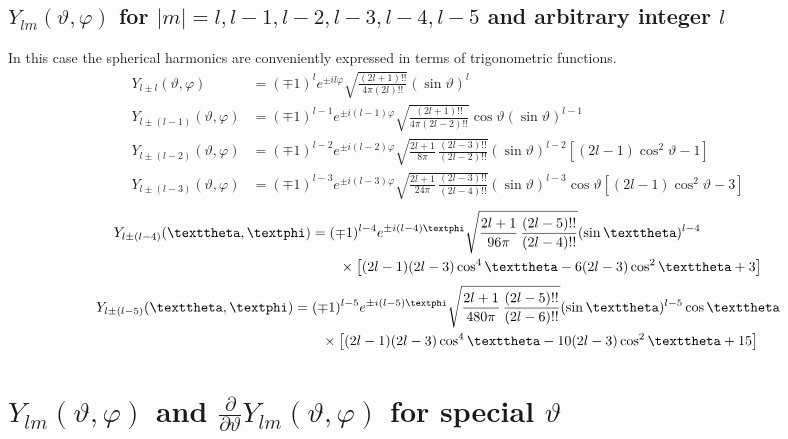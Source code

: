 \subsection{$Y_{l m}(\vartheta, \varphi)$ for $|m|=l, l-1, l-2, l-3, l-4, l-5$ and arbitrary integer $l$}\label{sec:5.13.3}
In this case the spherical harmonics are conveniently expressed in terms of trigonometric functions.
\begin{align}
Y_{l \pm l}(\vartheta, \varphi) & =(\mp 1)^{l} e^{ \pm i l \varphi} \sqrt{\frac{(2 l+1)!!}{4 \pi(2 l)!!}}(\sin \vartheta)^{l}  \label{eq:5:13:6}\\
Y_{l \pm(l-1)}(\vartheta, \varphi) & =(\mp 1)^{l-1} e^{ \pm i(l-1) \varphi} \sqrt{\frac{(2 l+1)!!}{4 \pi(2 l-2)!!}} \cos \vartheta(\sin \vartheta)^{l-1}  \label{eq:5:13:7}\\
Y_{l \pm(l-2)}(\vartheta, \varphi) & =(\mp 1)^{l-2} e^{ \pm i(l-2) \varphi} \sqrt{\frac{2 l+1}{8 \pi} \, \frac{(2 l-3)!!}{(2 l-2)!!}}(\sin \vartheta)^{l-2}\left[(2 l-1) \cos ^{2} \vartheta-1\right]  \label{eq:5:13:8}\\
Y_{l \pm(l-3)}(\vartheta, \varphi) & =(\mp 1)^{l-3} e^{ \pm i(l-3) \varphi} \sqrt{\frac{2 l+1}{24 \pi} \, \frac{(2 l-3)!!}{(2 l-4)!!}}(\sin \vartheta)^{l-3} \cos \vartheta\left[(2 l-1) \cos ^{2} \vartheta-3\right] \label{eq:5:13:9}
\end{align}
\begin{align}
 Y_{l \pm(l-4)}(\vartheta, \varphi)&=(\mp 1)^{l-4} e^{ \pm i(l-4) \varphi} \sqrt{\frac{2 l+1}{96 \pi} \, \frac{(2 l-5)!!}{(2 l-4)!!}}(\sin \vartheta)^{l-4}  \notag\\
& \qquad\times\left[(2 l-1)(2 l-3) \cos ^{4} \vartheta-6(2 l-3) \cos ^{2} \vartheta+3\right] \label{eq:5:13:10}
\end{align}
\begin{align}
 Y_{l \pm(l-5)}(\vartheta, \varphi)&=(\mp 1)^{l-5} e^{ \pm i(l-5) \varphi} \sqrt{\frac{2 l+1}{480 \pi} \, \frac{(2 l-5)!!}{(2 l-6)!!}}(\sin \vartheta)^{l-5} \cos \vartheta  \notag\\
&\qquad \times\left[(2 l-1)(2 l-3) \cos ^{4} \vartheta-10(2 l-3) \cos ^{2} \vartheta+15\right] \label{eq:5:13:11}
\end{align}
\section{$Y_{l m}(\vartheta, \varphi)$ and $\frac{\partial}{\partial \vartheta} Y_{l m}(\vartheta, \varphi)$ for special $\vartheta$}\label{sec:5.14}
